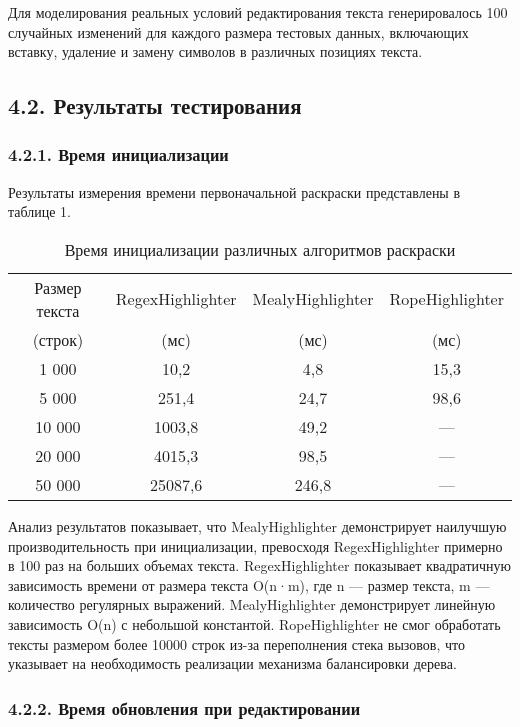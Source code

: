 Для моделирования реальных условий редактирования текста генерировалось 100 случайных изменений для каждого размера тестовых данных, включающих вставку, удаление и замену символов в различных позициях текста.

\subsection*{4.2. Результаты тестирования}

\subsubsection*{4.2.1. Время инициализации}

Результаты измерения времени первоначальной раскраски представлены в таблице 1.

\begin{table}[h]
\centering
\caption{Время инициализации различных алгоритмов раскраски}
\begin{tabular}{|c|c|c|c|}
\hline
Размер текста & RegexHighlighter & MealyHighlighter & RopeHighlighter \\
(строк) & (мс) & (мс) & (мс) \\
\hline
1 000 & 10,2 & 4,8 & 15,3 \\
5 000 & 251,4 & 24,7 & 98,6 \\
10 000 & 1003,8 & 49,2 & --- \\
20 000 & 4015,3 & 98,5 & --- \\
50 000 & 25087,6 & 246,8 & --- \\
\hline
\end{tabular}
\end{table}

Анализ результатов показывает, что MealyHighlighter демонстрирует наилучшую производительность при инициализации, превосходя RegexHighlighter примерно в 100 раз на больших объемах текста. RegexHighlighter показывает квадратичную зависимость времени от размера текста O(n·m), где n — размер текста, m — количество регулярных выражений. MealyHighlighter демонстрирует линейную зависимость O(n) с небольшой константой. RopeHighlighter не смог обработать тексты размером более 10000 строк из-за переполнения стека вызовов, что указывает на необходимость реализации механизма балансировки дерева.

\subsubsection*{4.2.2. Время обновления при редактировании}

